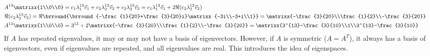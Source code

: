 \begin{align*}
    &A^{13}\matrixx{1\\0\\0}=c_1\lambda_1^{13}\vec{v}_1+c_2\lambda_2^{13}\vec{v}_2+c_3\lambda_3^{13}\vec{v}_3=c_1\lambda_1^{13}\vec{v}_1+2\Re(c_2\lambda_2^{13}\vec{v}_2)\\
    &\Re(c_2\lambda_2^{13}\vec{v}_2)=\Re\brround{\brround{-\frac{1}{20}+\frac{3}{20}i}\matrixx{-3i\\-3+i\\1}}=\matrixx{-\frac{3}{20}\\\frac{1}{2}\\-\frac{3}{20}}\\
    &A^{13}\matrixx{1\\0\\0}=3^{13}+2\matrixx{-\frac{3}{20}\\\frac{1}{2}\\-\frac{3}{20}}=\matrixx{3^{13}-\frac{3}{10}\\1\\3^{13}-\frac{3}{10}}
\end{align*}
If $A$ has repeated eigenvalues, it may or may not have a basis of eigenvectors. However, if $A$ is symmetric ($A=A^T$), it always has a basis of eigenvectors, even if eigenvalues are repeated, and all eigenvalues are real. This introduces the idea of eigenspaces.

